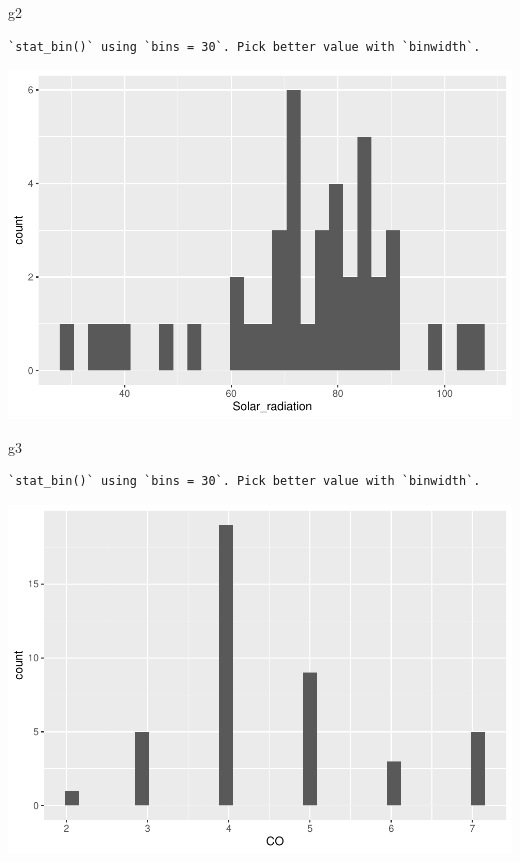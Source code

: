 \documentclass[
]{article}
\newenvironment{Shaded}{\begin{snugshade}}{\end{snugshade}}
\newcommand{\NormalTok}[1]{#1}
\begin{document}
\begin{Shaded}
\begin{Highlighting}[]
\NormalTok{g2}
\end{Highlighting}
\end{Shaded}

\begin{verbatim}
`stat_bin()` using `bins = 30`. Pick better value with `binwidth`.
\end{verbatim}

\includegraphics{Tarea1_files/figure-latex/unnamed-chunk-9-3.pdf}

\begin{Shaded}
\begin{Highlighting}[]
\NormalTok{g3}
\end{Highlighting}
\end{Shaded}

\begin{verbatim}
`stat_bin()` using `bins = 30`. Pick better value with `binwidth`.
\end{verbatim}

\includegraphics{Tarea1_files/figure-latex/unnamed-chunk-9-4.pdf}
\end{document}
